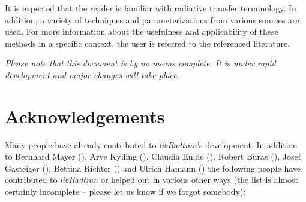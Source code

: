 It is expected that the reader is familiar with radiative transfer
terminology. In addition, a variety of techniques and
parameterizations from various sources are used. For more information
about the usefulness and applicability of these methods in a specific
context, the user is referred to the referenced literature.

{\sl Please note that this document is by no means complete. It is
under rapid development and major changes will take place.} 


\section*{Acknowledgements}

Many people have already contributed to {\sl libRadtran}'s
development. In addition to Bernhard Mayer (), Arve Kylling (), Claudia Emde
(), Robert Buras
(), Josef Gasteiger
(), Bettina Richter
() and Ulrich 
Hamann () the following people have
contributed to {\sl libRadtran} or helped out in various other ways
(the list is almost certainly incomplete -- please let us know if we
forgot somebody):

